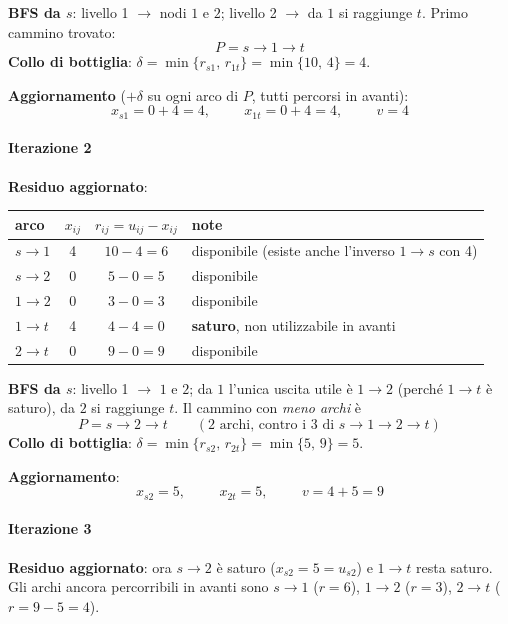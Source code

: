\documentclass[12pt]{extarticle} %
\begin{document}
\noindent\textbf{BFS da $s$}: livello 1 $\to$ nodi $1$ e $2$; livello 2 $\to$ da $1$ si raggiunge $t$. Primo cammino trovato:
\[
P = s\to 1\to t
\]
\textbf{Collo di bottiglia}: $\delta = \min\{r_{s1},\, r_{1t}\} = \min\{10,\,4\} = 4$.

\noindent\textbf{Aggiornamento} ($+\delta$ su ogni arco di $P$, tutti percorsi in avanti):
\[
x_{s1} = 0+4 = 4, \hspace{1cm} x_{1t} = 0+4 = 4, \hspace{1cm} v = 4
\]

\paragraph{Iterazione 2}
\textbf{Residuo aggiornato}:
\begin{center}
\begin{tabular}{lccl}
\hline
\textbf{arco} & \textbf{$x_{ij}$} & \textbf{$r_{ij} = u_{ij}-x_{ij}$} & \textbf{note} \\
\hline
$s\to1$ & 4 & $10-4 = 6$ & disponibile (esiste anche l'inverso $1\to s$ con 4) \\
$s\to2$ & 0 & $5-0 = 5$ & disponibile \\
$1\to2$ & 0 & $3-0 = 3$ & disponibile \\
$1\to t$ & 4 & $4-4 = 0$ & \textbf{saturo}, non utilizzabile in avanti \\
$2\to t$ & 0 & $9-0 = 9$ & disponibile \\
\hline
\end{tabular}
\end{center}
\textbf{BFS da $s$}: livello 1 $\to$ $1$ e $2$; da $1$ l'unica uscita utile è $1\to2$ (perché $1\to t$ è saturo), da $2$ si raggiunge $t$. Il cammino con \emph{meno archi} è
\[
P = s\to 2 \to t \qquad (2 \text{ archi, contro i } 3 \text{ di } s\to1\to2\to t)
\]
\textbf{Collo di bottiglia}: $\delta = \min\{r_{s2},\, r_{2t}\} = \min\{5,\,9\} = 5$.

\noindent\textbf{Aggiornamento}:
\[
x_{s2} = 5, \hspace{1cm} x_{2t} = 5, \hspace{1cm} v = 4 + 5 = 9
\]

\paragraph{Iterazione 3}
\textbf{Residuo aggiornato}: ora $s\to2$ è saturo ($x_{s2}=5=u_{s2}$) e $1\to t$ resta saturo. Gli archi ancora percorribili in avanti sono $s\to1$ ($r=6$), $1\to2$ ($r=3$), $2\to t$ ($r = 9-5 = 4$).
\end{document}
